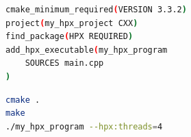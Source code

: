 \documentclass[11pt,fleqn]{book} %
\begin{document}
\begin{minipage}{\linewidth}
\begin{minipage}{0.45\linewidth}
\begin{lstlisting}[language=bash,caption={Content of the CMakeLists.txt to build HPX applications.\label{code:cmake:hpx}},emph={project, add_executable,cmake_minimum_required},emphstyle={\color{azure}\bfseries}]
cmake_minimum_required(VERSION 3.3.2)
project(my_hpx_project CXX)
find_package(HPX REQUIRED)
add_hpx_executable(my_hpx_program
    SOURCES main.cpp
)
\end{lstlisting}
\end{minipage}
\hfill
\begin{minipage}{0.45\linewidth}
\begin{lstlisting}[language=bash,caption={Build instructions for CMake.\label{code:cmake:compile:hpx}}]
cmake .
make
./my_hpx_program --hpx:threads=4
\end{lstlisting}
\end{minipage}
\end{minipage}



\end{document}

